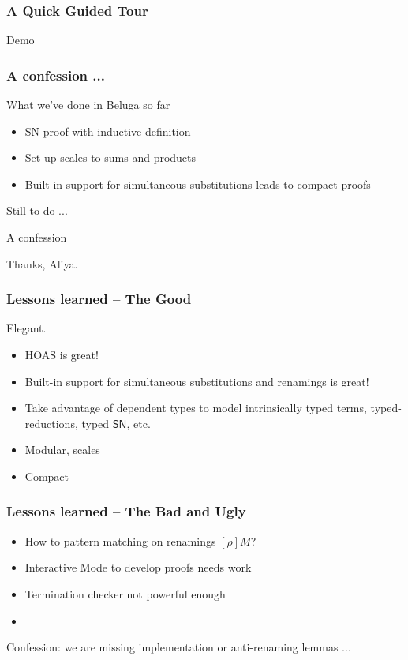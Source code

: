 \documentclass{beamer}
\newcommand{\SN}{\mathsf{SN}}
\begin{document}
\begin{frame}[fragile]
\end{frame}


\begin{frame}
  \frametitle{A Quick Guided Tour}
  
Demo

\end{frame}



\begin{frame}\frametitle{A confession ...}
  
What we've done in Beluga so far
\begin{itemize}
\item SN proof with inductive definition 
\item Set up scales to sums and products
\item Built-in support for simultaneous substitutions leads to compact proofs
\end{itemize}

Still to do ...


A confession 

Thanks, Aliya.

\end{frame}


\begin{frame}
  \frametitle{Lessons learned -- The Good}
Elegant.
  \begin{itemize}
  \item HOAS is great!
  \item Built-in support for simultaneous substitutions and renamings
    is great!
  \item Take advantage of dependent types to model intrinsically typed
    terms, typed-reductions, typed $\SN$, etc.
  \item Modular, scales
  \item Compact
  \end{itemize}
\end{frame}

\begin{frame}
  \frametitle{Lessons learned -- The Bad and Ugly}
  \begin{itemize}
  \item How to pattern matching on renamings $[\rho]M$?
  \item Interactive Mode to develop proofs needs work
  \item Termination checker not powerful enough
  \item 
  \end{itemize}

Confession: we are missing implementation or anti-renaming lemmas ...
\end{frame}
\end{document}
